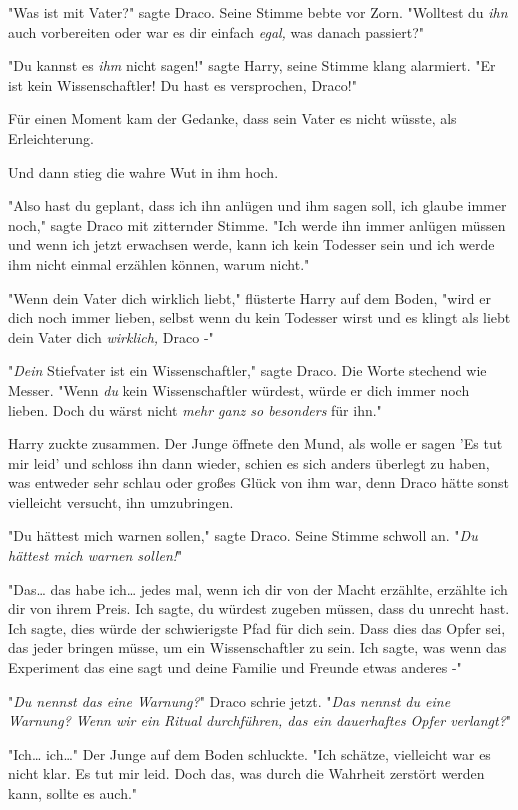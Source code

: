 {"Was ist mit Vater?" sagte Draco. Seine Stimme bebte vor Zorn. "Wolltest du \emph{ihn} auch vorbereiten oder war es dir einfach \emph{egal,} was danach passiert?"

"Du kannst es \emph{ihm} nicht sagen!" sagte Harry, seine Stimme klang alarmiert. "Er ist kein Wissenschaftler! Du hast es versprochen, Draco!"

Für einen Moment kam der Gedanke, dass sein Vater es nicht wüsste, als Erleichterung.

Und dann stieg die wahre Wut in ihm hoch.

"Also hast du geplant, dass ich ihn anlügen und ihm sagen soll, ich glaube immer noch," sagte Draco mit zitternder Stimme. "Ich werde ihn immer anlügen müssen und wenn ich jetzt erwachsen werde, kann ich kein Todesser sein und ich werde ihm nicht einmal erzählen können, warum nicht."

"Wenn dein Vater dich wirklich liebt," flüsterte Harry auf dem Boden, "wird er dich noch immer lieben, selbst wenn du kein Todesser wirst und es klingt als liebt dein Vater dich \emph{wirklich,} Draco -"

"\emph{Dein} Stiefvater ist ein Wissenschaftler," sagte Draco. Die Worte stechend wie Messer. "Wenn \emph{du} kein Wissenschaftler würdest, würde er dich immer noch lieben. Doch du wärst nicht \emph{mehr ganz so besonders} für ihn."

Harry zuckte zusammen. Der Junge öffnete den Mund, als wolle er sagen 'Es tut mir leid' und schloss ihn dann wieder, schien es sich anders überlegt zu haben, was entweder sehr schlau oder großes Glück von ihm war, denn Draco hätte sonst vielleicht versucht, ihn umzubringen.

"Du hättest mich warnen sollen," sagte Draco. Seine Stimme schwoll an. "\emph{Du hättest mich warnen sollen!}"

"Das… das habe ich… jedes mal, wenn ich dir von der Macht erzählte, erzählte ich dir von ihrem Preis. Ich sagte, du würdest zugeben müssen, dass du unrecht hast. Ich sagte, dies würde der schwierigste Pfad für dich sein. Dass dies das Opfer sei, das jeder bringen müsse, um ein Wissenschaftler zu sein. Ich sagte, was wenn das Experiment das eine sagt und deine Familie und Freunde etwas anderes -"

"\emph{Du nennst das eine Warnung?}" Draco schrie jetzt. "\emph{Das nennst du eine Warnung? Wenn wir ein Ritual durchführen, das ein dauerhaftes Opfer verlangt?}"

"Ich… ich…" Der Junge auf dem Boden schluckte. "Ich schätze, vielleicht war es nicht klar. Es tut mir leid. Doch das, was durch die Wahrheit zerstört werden kann, sollte es auch."

}
